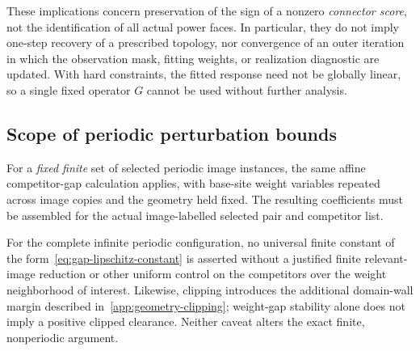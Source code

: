 These implications concern preservation of the sign of a nonzero \emph{connector score}, not the identification of all actual power faces. In particular, they do not imply one-step recovery of a prescribed topology, nor convergence of an outer iteration in which the observation mask, fitting weights, or realization diagnostic are updated. With hard constraints, the fitted response need not be globally linear, so a single fixed operator $G$ cannot be used without further analysis.

\subsection{Scope of periodic perturbation bounds}
\label{app:stability-periodic}

For a \emph{fixed finite} set of selected periodic image instances, the same affine competitor-gap calculation applies, with base-site weight variables repeated across image copies and the geometry held fixed. The resulting coefficients must be assembled for the actual image-labelled selected pair and competitor list.

For the complete infinite periodic configuration, no universal finite constant of the form~\eqref{eq:gap-lipschitz-constant} is asserted without a justified finite relevant-image reduction or other uniform control on the competitors over the weight neighborhood of interest. Likewise, clipping introduces the additional domain-wall margin described in~\ref{app:geometry-clipping}; weight-gap stability alone does not imply a positive clipped clearance. Neither caveat alters the exact finite, nonperiodic argument.
